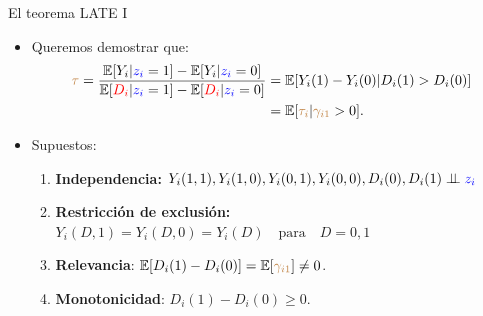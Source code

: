 \documentclass[10pt, xcolor=dvipsnames]{beamer}
\begin{document}
\begin{frame}{El teorema LATE I}\label{ANEX:TEOR-LATE}
\begin{itemize}
    \item Queremos demostrar que:
    \begin{align*}
\begin{split}
\textcolor{brown}{\tau} = \frac{\operatorname{\mathbb{E}}[Y_i|\textcolor{blue}{z_i} =1] - \operatorname{\mathbb{E}}[Y_i|\textcolor{blue}{z_i} =0]}{\operatorname{\mathbb{E}}[\textcolor{red}{D_i}|\textcolor{blue}{z_i} =1] - \operatorname{\mathbb{E}}[\textcolor{red}{D_i}|\textcolor{blue}{z_i} =0]} &= \operatorname{\mathbb{E}}[Y_i(1)-Y_i(0)|D_i(1)>D_i(0)] \\
&= \operatorname{\mathbb{E}}[\textcolor{brown}{\tau_i}|\textcolor{brown}{\gamma_{i1}}>0]. 	
\end{split}	
\end{align*}
\item Supuestos:
\begin{enumerate}\setlength{\itemsep}{0.8em}
    \item \textbf{Independencia:} \(Y_i(1,1), Y_i(1,0), Y_i(0,1), Y_i(0,0),D_i(0), D_i(1) \perp \!\!\! \perp \textcolor{blue}{z_i}\)
    \item \textbf{Restricción de exclusión:} {\small \(Y_i(D,1)=Y_i(D,0) = Y_i(D) \quad \text{para} \quad D=0,1\)}
    \item \textbf{Relevancia}: $\operatorname{\mathbb{E}}[D_i(1)-D_i(0)]=\operatorname{\mathbb{E}}[\textcolor{brown}{\gamma_{i1}}]\neq0$.
    \item \textbf{Monotonicidad}: \(D_i(1) - D_i(0) \geq 0\).
\end{enumerate}
\end{itemize}
\end{frame}
\end{document}
